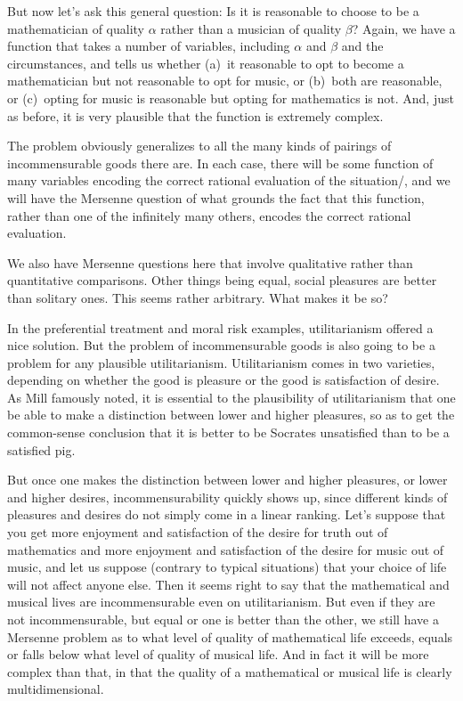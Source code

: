 But now let's ask this general question: Is it is reasonable to choose to be a mathematician of quality $\alpha$ rather than
a musician of quality $\beta$? Again, we have a function that takes a number of variables, including $\alpha$ and $\beta$
and the circumstances, and tells us whether (a)~it reasonable to opt to become a mathematician but not reasonable to opt for
music, or (b)~both are reasonable, or (c)~opting for music is reasonable but opting for mathematics is not. And, just as before,
it is very plausible that the function is extremely complex.

The problem obviously generalizes to all the many kinds of pairings of incommensurable goods there are.  In each case, there 
will be some function of many variables encoding the correct rational evaluation of the situation/, and we will have the Mersenne
question of what grounds the fact that this function, rather than one of the infinitely many others, encodes the correct
rational evaluation.

We also have Mersenne questions here that involve qualitative rather than quantitative comparisons. Other things being equal,
social pleasures are better than solitary ones. This seems rather arbitrary. What makes it be so?
 
In the preferential treatment and moral risk examples, utilitarianism offered a nice solution. But the problem of incommensurable goods is
also going to be a problem for any plausible utilitarianism. Utilitarianism comes in two varieties, depending on whether
the good is pleasure or the good is satisfaction of desire. As Mill famously noted, it is essential to the plausibility
of utilitarianism that one be able to make a distinction between lower and higher pleasures, so as to get the common-sense
conclusion that it is better to be Socrates unsatisfied than to be a satisfied pig.

But once one makes the distinction between lower and higher pleasures, or lower and higher desires, incommensurability
quickly shows up, since different kinds of pleasures and desires do not simply come in a linear ranking. Let's suppose that you get more 
enjoyment and satisfaction of the desire for truth out of mathematics and more enjoyment and satisfaction of the desire for music out of music, and let us suppose (contrary to typical situations)
that your choice of life will not affect anyone else. Then it seems right to say that the mathematical and musical lives are
incommensurable even on utilitarianism. But even if they are not incommensurable, but equal or one is better than the other, 
we still have a Mersenne problem as to what level of quality of mathematical life exceeds, equals or falls below what level of 
quality of musical life. And in fact it will be more complex than that, in that the quality of a mathematical or musical life
is clearly multidimensional.

